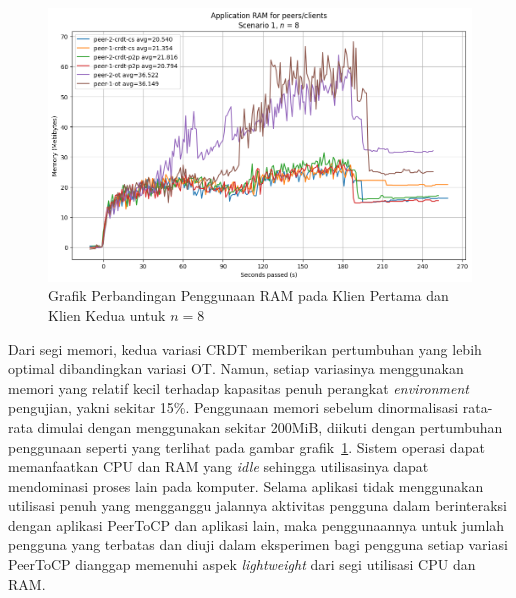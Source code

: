 \begin{figure}
 \centering
 \includegraphics[width=13cm]{./assets/skripsi/benchmark-vis_cell_2_output_21}
 \caption{Grafik Perbandingan Penggunaan RAM pada Klien Pertama dan Klien Kedua untuk $n = 8$}
 \label{fig:2-21}
\end{figure}

Dari segi memori, kedua variasi CRDT memberikan pertumbuhan yang lebih optimal dibandingkan variasi OT. Namun, setiap variasinya menggunakan memori yang relatif kecil terhadap kapasitas penuh perangkat \textit{environment} pengujian, yakni sekitar 15\%. Penggunaan memori sebelum dinormalisasi rata-rata dimulai dengan menggunakan sekitar 200MiB, diikuti dengan pertumbuhan penggunaan seperti yang terlihat pada gambar grafik~\ref{fig:2-21}. Sistem operasi dapat memanfaatkan CPU dan RAM yang \textit{idle} sehingga utilisasinya dapat mendominasi proses lain pada komputer. Selama aplikasi tidak menggunakan utilisasi penuh yang mengganggu jalannya aktivitas pengguna dalam berinteraksi dengan aplikasi PeerToCP dan aplikasi lain, maka penggunaannya untuk jumlah pengguna yang terbatas dan diuji dalam eksperimen bagi pengguna setiap variasi PeerToCP dianggap memenuhi aspek \textit{lightweight} dari segi utilisasi CPU dan RAM.


